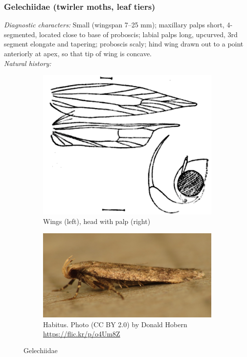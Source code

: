 \documentclass[letterpaper, 11pt]{article}
\begin{document}
\subsubsection{Gelechiidae (twirler moths, leaf tiers)}
\noindent{}\textit{Diagnostic characters:} Small (wingspan 7--25 mm); maxillary palps short, 4-segmented, located close to base of proboscis; labial palps long, upcurved, 3rd segment elongate and tapering; proboscis scaly; hind wing drawn out to a point anteriorly at apex, so that tip of wing is concave.\\

\noindent{}\textit{Natural history:} 

\begin{figure}[ht!]
    \centering
    \begin{subfigure}[ht!]{0.4\textwidth}
        \includegraphics[width=\textwidth]{GelechiidWing}
        \caption{Wings (left), head with palp (right) \citep[][Fig. 27]{busck1903revision}}
        \label{fig:gelechiid1}
    \end{subfigure}
    \qquad %
    \begin{subfigure}[ht!]{0.45\textwidth}
        \includegraphics[width=\textwidth]{gelechiid}
        \caption{Habitus. Photo (CC BY 2.0) by Donald Hobern \url{https://flic.kr/p/o4Um8Z}}
        \label{fig:gelechiid2}
    \end{subfigure}
    \caption{Gelechiidae}\label{fig:gelechiids}
\end{figure}
\end{document}

